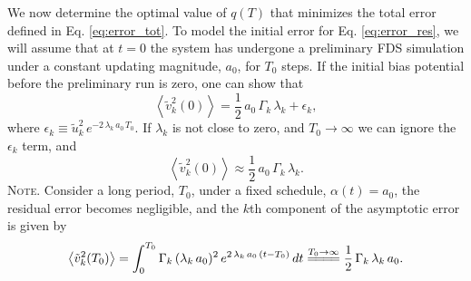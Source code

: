 \documentclass[reprint, superscriptaddress, floatfix]{revtex4-1}
\newcommand{\note}[1]{{\color{DarkGreen}\footnotesize \textsc{Note.} #1}}
\begin{document}
We now determine the optimal value of $q(T)$
that minimizes the total error defined in Eq. \eqref{eq:error_tot}.
%
To model the initial error for Eq. \eqref{eq:error_res},
we will assume that at $t = 0$
the system has undergone a preliminary FDS simulation
under a constant updating magnitude, $a_0$,
for $T_0$ steps.
%
If the initial bias potential
before the preliminary run is zero,
one can show that
\begin{equation}
  \left\langle
    {\tilde v}_k^2(0)
  \right\rangle
  = \frac 1 2 \, a_0 \, \Gamma_k \, \lambda_k
  + \epsilon_k
  ,
  \label{eq:xt2_eql1}
\end{equation}
%
where
$\epsilon_k \equiv \tilde u_k^2 \, e^{-2\, \lambda_k \, a_0 \, T_0}$.
%
If $\lambda_k$ is not close to zero, and $T_0 \to \infty$
we can ignore the $\epsilon_k$ term, and
%
\begin{equation}
  \left\langle
    {\tilde v}_k^2(0)
  \right\rangle
  \approx
  \frac 1 2 \, a_0 \, \Gamma_k \, \lambda_k
  .
  \label{eq:xt2_eql}
\end{equation}
%
\note{
Consider a long period, $T_0$, under a fixed schedule,
$\alpha(t) = a_0$,
the residual error becomes negligible, and
the $k$th component of the asymptotic error
is given by
%
\begin{align*}
  \left\langle
    {\tilde v}_k^2(T_0)
  \right\rangle
  =
  \int_0^{T_0}
    \Gamma_k \, (\lambda_k \, a_0)^2 \,
      e^{ 2 \, \lambda_k \, a_0 \, (t - T_0) }
    \, dt
  \stackrel{ T_0 \to \infty }
  { =\joinrel=\joinrel=\joinrel= }
  \frac 1 2 \, \Gamma_k \, \lambda_k \, a_0
  .
\notag
\end{align*}
}
%
\end{document}
